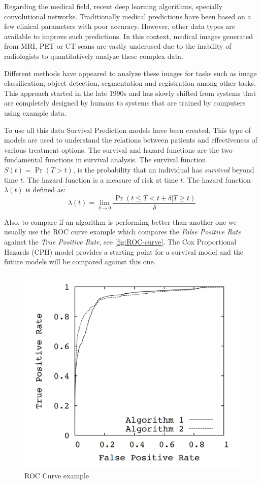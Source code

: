 \documentclass[a4paper, 12pt]{article}
\begin{document}
Regarding the medical field, recent deep learning algorithms, specially convolutional networks. 
Traditionally medical predictions have been based on a few clinical parameters with poor accuracy.
However, other data types are available to improve such predictions. In this context, medical
images generated from MRI, PET or CT scans are vastly underused due to the inability of radiologists
to quantitatively analyze these complex data. 

Different methods have appeared to analyze these images for tasks such as
image classification, object detection, segmentation and registration among other tasks. This
approach started in the late 1990s and has slowly shifted from systems that are completely designed
by humans to systems that are trained by computers using example data. 
~\cite{survey-deep-learning}

To use all this data Survival Prediction models have been created. This type of models are
used to understand the relations between patients and effectiveness of various treatment options. 
The survival and hazard functions are the two fundamental functions in survival analysis. The
survival function \( S(t) = \Pr(T > t) \), is the probability that an individual has
\emph{survived} beyond time \( t \). The hazard function is a measure of risk at time \( t \).
The hazard function \( \lambda(t) \) is defined as:
~\cite{DeepSurv}
\[
    \lambda(t) = \lim_{\delta \rightarrow 0}
    \frac{\Pr(t \le T < t + \delta | T \ge t)}{\delta}
\]


Also, to compare if an algorithm is performing better than another one we usually use the ROC curve
example which compares the \emph{False Positive Rate} against the \emph{True Positive Rate},
see \autoref{fig:ROC-curve}. The Cox Proportional Hazards (CPH) model provides a starting point for a 
survival model and the future models will be compared against this one.
~\cites{ROC-precision-recall}{Cox}

\begin{figure}
    \centering
    \includegraphics[width=.5\linewidth]{images/roc_curve}
    \caption{ROC Curve example\label{fig:ROC-curve}}
\end{figure}
\end{document}

